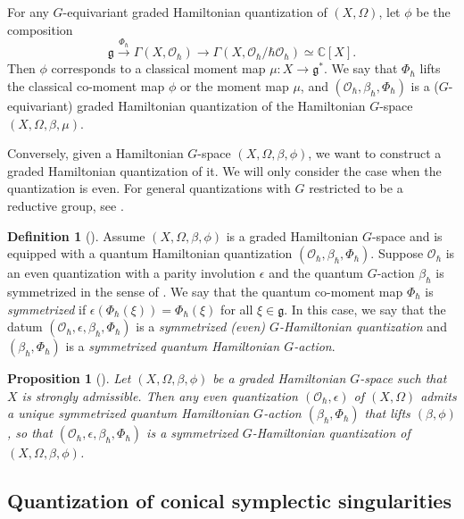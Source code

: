 \documentclass[11pt, a4paper]{amsart}
\newcommand{\C}{\mathbb{C}}
\newcommand{\g}{\mathfrak{g}}
\newcommand{\fg}{\mathfrak{g}}
\newcommand{\hb}{\hbar}
\newcommand{\OO}{\mathcal{O}}
\newtheorem{Prop}[Thm]{Proposition}
\theoremstyle{definition}
\newtheorem{defi}[Thm]{Definition}
\numberwithin{equation}{section}
\begin{document}
For any $G$-equivariant graded Hamiltonian quantization of $(X, \Omega)$, let $\phi$ be the composition 
\[ \g \xrightarrow{\Phi_\hb} \Gamma(X, \OO_\hb) \to \Gamma(X, \OO_\hb / \hb \OO_\hb) \simeq \C[X]. 
\]
Then $\phi$ corresponds to a classical moment map $\mu: X \to \g^*$. We say that $\Phi_\hb$ lifts the classical co-moment map $\phi$ or the moment map $\mu$, and $(\OO_\hb, \beta_\hb, \Phi_\hb)$ is a ($G$-equivariant) graded Hamiltonian quantization of the Hamiltonian $G$-space $(X, \Omega, \beta, \mu)$. 

Conversely, given a Hamiltonian $G$-space $(X, \Omega, \beta, \phi)$, we want to construct a graded Hamiltonian quantization of it. We will only consider the case when the quantization is even. For general quantizations with $G$ restricted to be a reductive group, see \cite[Proposition 3.11]{BPW}.


\begin{defi}[{\cite[Definition 3.4.2]{LY}}]\label{defn:quan_moment_symm}
	Assume $(X,\Omega,\beta,\phi)$ is a graded Hamiltonian $G$-space and is equipped with a quantum Hamiltonian quantization $(\OO_\hb, \beta_\hb, \Phi_\hb)$. Suppose $\OO_\hb$ is an even quantization with a parity involution $\epsilon$ and the quantum $G$-action $\beta_\hb$ is symmetrized in the sense of . We say that the quantum co-moment map $\Phi_\hb$ is \emph{symmetrized} if $\epsilon(\Phi_\hb(\xi)) = \Phi_\hb(\xi)$ for all $\xi \in \fg$. In this case, we say that the datum $(\OO_\hb, \epsilon, \beta_\hb, \Phi_\hb)$ is a \emph{symmetrized (even) $G$-Hamiltonian quantization} and $(\beta_\hb,\Phi_\hb)$ is a \emph{symmetrized quantum Hamiltonian $G$-action}.
\end{defi}

\begin{Prop}[{\cite[Proposition 3.4.4]{LY}}]\label{prop:quan_moment_symm}
	Let $(X,\Omega, \beta, \phi)$ be a graded Hamiltonian $G$-space such that $X$ is strongly admissible. Then any even quantization $(\OO_\hb, \epsilon)$ of $(X,\Omega)$ admits a unique symmetrized quantum Hamiltonian $G$-action $(\beta_\hb, \Phi_\hb)$ that lifts $(\beta,\phi)$, so that $(\OO_\hb, \epsilon, \beta_\hb, \Phi_\hb)$ is a symmetrized $G$-Hamiltonian quantization of $(X,\Omega, \beta, \phi)$.
\end{Prop}


\subsection{Quantization of conical symplectic singularities} \label{subsec:quant_conical_symp_sing}
\end{document}

